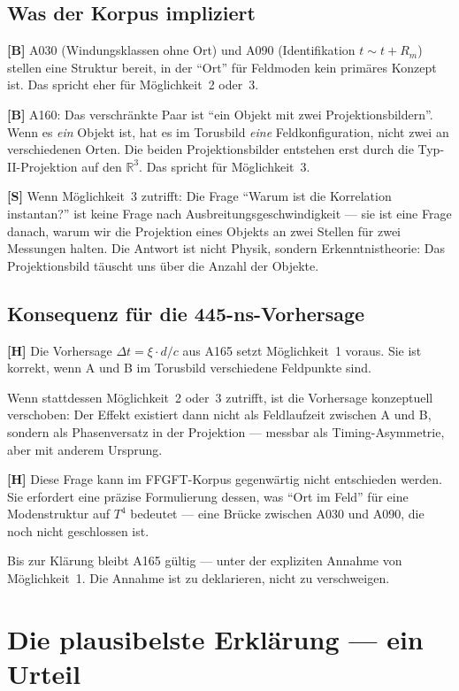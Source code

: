 \subsection{Was der Korpus impliziert}

\textbf{[B]} A030 (Windungsklassen ohne Ort) und A090 (Identifikation
$t \sim t + R_m$) stellen eine Struktur bereit, in der ``Ort'' für
Feldmoden kein primäres Konzept ist. Das spricht eher für
Möglichkeit~2 oder~3.

\textbf{[B]} A160: Das verschränkte Paar ist ``ein Objekt mit zwei
Projektionsbildern''. Wenn es \emph{ein} Objekt ist, hat es im
Torusbild \emph{eine} Feldkonfiguration, nicht zwei an verschiedenen
Orten. Die beiden Projektionsbilder entstehen erst durch die Typ-II-Projektion
auf den $\mathbb{R}^3$. Das spricht für Möglichkeit~3.

\textbf{[S]} Wenn Möglichkeit~3 zutrifft: Die Frage ``Warum ist die
Korrelation instantan?'' ist keine Frage nach Ausbreitungsgeschwindigkeit
--- sie ist eine Frage danach, warum wir die Projektion eines Objekts
an zwei Stellen für zwei Messungen halten. Die Antwort ist nicht Physik,
sondern Erkenntnistheorie: Das Projektionsbild täuscht uns über die
Anzahl der Objekte.

\subsection{Konsequenz für die 445-ns-Vorhersage}

\textbf{[H]} Die Vorhersage $\Delta t = \xi \cdot d/c$ aus A165
setzt Möglichkeit~1 voraus. Sie ist korrekt, wenn A und B im
Torusbild verschiedene Feldpunkte sind.

Wenn stattdessen Möglichkeit~2 oder~3 zutrifft, ist die Vorhersage
konzeptuell verschoben: Der Effekt existiert dann nicht als Feldlaufzeit
zwischen A und B, sondern als Phasenversatz in der Projektion ---
messbar als Timing-Asymmetrie, aber mit anderem Ursprung.

\textbf{[H]} Diese Frage kann im FFGFT-Korpus gegenwärtig nicht
entschieden werden. Sie erfordert eine präzise Formulierung dessen,
was ``Ort im Feld'' für eine Modenstruktur auf $T^4$ bedeutet ---
eine Brücke zwischen A030 und A090, die noch nicht geschlossen ist.

Bis zur Klärung bleibt A165 gültig --- unter der expliziten Annahme
von Möglichkeit~1. Die Annahme ist zu deklarieren, nicht zu
verschweigen.

\section{Die plausibelste Erklärung --- ein Urteil}
\label{sec:urteil}

